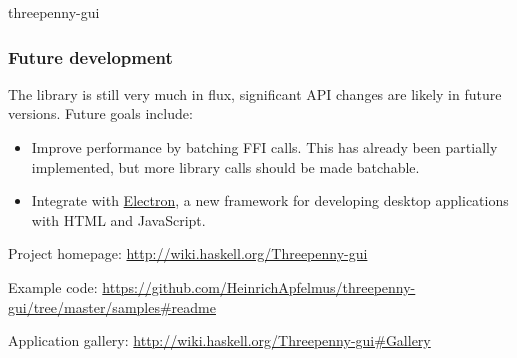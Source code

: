 \begin{hcarentry}{threepenny-gui}
\subsubsection*{Future development}

The library is still very much in flux, significant API changes are likely in future versions. Future goals include:

\begin{itemize}
    \item Improve performance by batching FFI calls.
        This has already been partially implemented,
        but more library calls should be made batchable.
    \item Integrate with \href{http://electron.atom.io/}{Electron}, a new framework for developing desktop applications with HTML and JavaScript.
\end{itemize}

\FurtherReading
\begin{compactitem}
\item Project homepage: \url{http://wiki.haskell.org/Threepenny-gui}
\item Example code: \url{https://github.com/HeinrichApfelmus/threepenny-gui/tree/master/samples#readme}
\item Application gallery: \url{http://wiki.haskell.org/Threepenny-gui#Gallery}
\end{compactitem}
\end{hcarentry}
